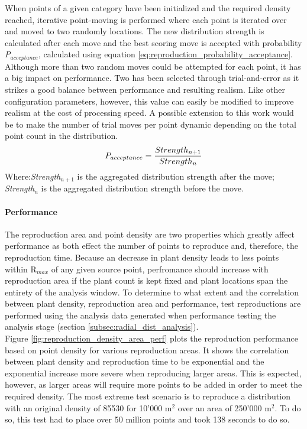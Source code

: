 When points of a given category have been initialized and the required density reached, iterative point-moving is performed where each point is iterated over and moved to two randomly locations. The new distribution strength is calculated after each move and the best scoring move is accepted with probability \textit{P$_{acceptance}$}, calculated using equation \ref{eq:reproduction_probability_acceptance}. Although more than two random moves could be attempted for each point, it has a big impact on performance. Two has been selected through trial-and-error as it strikes a good balance between performance and resulting realism. Like other configuration parameters, however, this value can easily be modified to improve realism at the cost of processing speed. A possible extension to this work would be to make the number of trial moves per point dynamic depending on the total point count in the distribution. \\

\begin{equation}
\centering
P_{acceptance} = \frac{Strength_{n+1}}{Strength_{n}}
\label{eq:reproduction_probability_acceptance}
\end{equation}
Where:\textit{Strength$_{n+1}$} is the aggregated distribution strength after the move; \textit{Strength$_{n}$} is the aggregated distribution strength before the move.

\paragraph{Performance}

The reproduction area and point density are two properties which greatly affect performance as both effect the number of points to reproduce and, therefore, the reproduction time. Because an decrease in plant density leads to less points within R$_{max}$ of any given source point, perfromance should increase with reproduction area if the plant count is kept fixed and plant locations span the entirety of the analysis window. To determine to what extent and the correlation between plant density, reproduction area and performance, test reproductions are performed using the analysis data generated when performance testing the analysis stage (section \ref{subsec:radial_dist_analysis}).\\

Figure \ref{fig:reproduction_density_area_perf} plots the reproduction performance based on point density for various reproduction areas. It shows the correlation between plant density and reproduction time to be exponential and the exponential increase more severe when reproducing larger areas. This is expected, however, as larger areas will require more points to be added in order to meet the required density. The most extreme test scenario is to reproduce a distribution with an original density of 85530 for 10'000 m$^{2}$ over an area of 250'000 m$^{2}$. To do so, this test had to place over 50 million points and took 138 seconds to do so.\\

